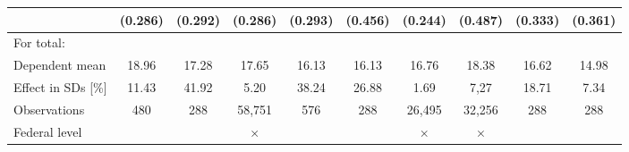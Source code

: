 \documentclass[11pt, a4paper]{article} %
\begin{document}
\begin{landscape}
\begin{table}[htbp]
\begin{threeparttable}
{\begin{tabular}{l*{9}{c}}
					&   (0.286)     	&	(0.292)			&   (0.286)			&	(0.293)			&	(0.456)			& 	(0.244)			&	(0.487)		&	(0.333)				&	(0.361)							\\
					\midrule            																																																			
					For total: 																																															\\							 
					Dependent mean 		&   18.96			&	17.28			&   17.65     		&	16.13			& 	16.13			&	16.76		&	18.38				&	16.62			&	14.98		\\
					Effect in SDs [\%] 	&   11.43			&	41.92			&   5.20      		&	38.24			& 	26.88			&	1.69		&	7,27				&	18.71			&	7.34		\\
					Observations 		&   480				&	288				&   58,751    		&	576				& 	288				&	26,495		&	32,256				&	288				&	288			\\
					Federal level		&   \checkmark		&	\checkmark		&   $\times$		& \checkmark		&	\checkmark		&	$\times$	&	$\times$			&	\checkmark		&  \checkmark	\\ 
					\bottomrule
			\end{tabular}}
	\end{threeparttable} \end{table} 
	\vspace*{\fill}\clearpage
\end{landscape}
\end{document}
